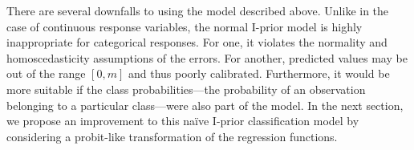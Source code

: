 There are several downfalls to using the model described above.
Unlike in the case of continuous response variables, the normal I-prior model is highly inappropriate for categorical responses.
For one, it violates the normality and homoscedasticity assumptions of the errors.
For another, predicted values may be out of the range $[0,m]$ and thus poorly calibrated.
Furthermore, it would be more suitable if the class probabilities---the probability of an observation belonging to a particular class---were also part of the model.
In the next section, we propose an improvement to this naïve I-prior classification model by considering a probit-like transformation of the regression functions.





























